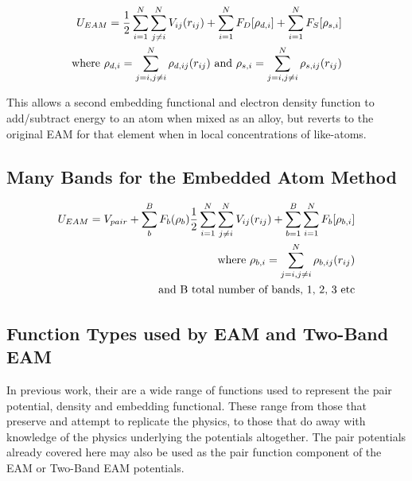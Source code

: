 \begin{equation}
\begin{split}
U_{EAM} = \frac{1}{2} \sum \limits_{i=1}^{N} \sum \limits_{j\ne i}^{N} V_{ij}(r_{ij}) + \sum \limits_{i=1}^{N} F_{D}[\rho _{d,i}] + \sum \limits_{i=1}^{N} F_{S}[\rho _{s,i}] \\
\textnormal{where   } \rho_{d,i} = \sum \limits_{j=i,j \ne i}^{N} \rho_{d,ij}(r_{ij})
\textnormal{  and  } \rho_{s,i} = \sum \limits_{j=i,j \ne i}^{N} \rho_{s,ij}(r_{ij})
\end{split}
\end{equation}

This allows a second embedding functional and electron density function to add/subtract energy to an atom when mixed as an alloy, but reverts to the original EAM for that element when in local concentrations of like-atoms.







\subsection{Many Bands for the Embedded Atom Method}

\begin{equation}
\begin{split}
U_{EAM} = V_{pair} + \sum_{b}^B F_b (\rho_b)
\frac{1}{2} \sum \limits_{i=1}^{N} \sum \limits_{j\ne i}^{N} V_{ij}(r_{ij}) + \sum \limits_{b=1}^{B} \sum \limits_{i=1}^{N} F_{b}[\rho _{b,i}] \\
\textnormal{where   } \rho_{b,i} = \sum \limits_{j=i,j \ne i}^{N} \rho_{b,ij}(r_{ij}) \\
\textnormal{and B total number of bands, 1, 2, 3 etc}
\end{split}
\end{equation}


\subsection{Function Types used by EAM and Two-Band EAM}

In previous work, their are a wide range of functions used to represent the pair potential, density and embedding functional.  These range from those that preserve and attempt to replicate the physics, to those that do away with knowledge of the physics underlying the potentials altogether.  The pair potentials already covered here may also be used as the pair function component of the EAM or Two-Band EAM potentials.

